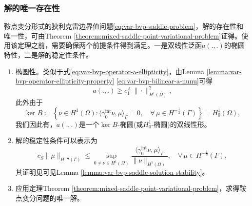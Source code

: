 \subsubsection{解的唯一存在性}
\label{sec:var-bvp-saddle-solution-uniq}
鞍点变分形式的狄利克雷边界值问题\eqref{eq:var-bvp-saddle-problem}，解的存在性和唯一性，可由Theorem \ref{theorem:mixed-saddle-point-variational-problem}证得。使用该定理之前，需要确保两个前提条件得到满足。一是双线性泛函$a(.,.)$的椭圆特性，二是解的稳定性条件。
\begin{enumerate}
\item 椭圆性。类似于式\eqref{eq:var-bvp-operator-a-ellipticity}，由Lemma \ref{lemma:var-bvp-operator-ellipticity-property} \eqref{eq:var-bvp-bilinear-a-nunu}可得
\begin{equation*}
  a(.,.) \ge c_1^A \, \big\| \cdot \big\|_{H^{1}(\Omega)}^2,
\end{equation*}
此外由于
\begin{equation*}
  \ker B \coloneqq \left\{
  \nu \in H^{1}(\Omega) : \langle \gamma_{0}^{\text{int}} \nu, \mu \rangle_{\Gamma} = 0, \quad \forall \, \mu \in H^{-\frac{1}{2}}(\Gamma)
  \right\} = H_{0}^{1}(\Omega),
\end{equation*}
我们因此有，$a(.,.)$是一个$\ker B$-椭圆(或$H_{0}^{1}$-椭圆)的双线性形。

\item 解的稳定性条件可以表示为
\begin{equation}
  \label{sec:var-bvp-saddle-solution-stability}
  c_S \big\| \mu \big\|_{H^{-\frac{1}{2}}(\Gamma)} \le
  \sup_{0 \neq \nu \in H^{1}(\Omega)} \frac{
  \langle \gamma_{0}^{\text{int}} \nu, \mu \rangle_{\Gamma}
  }{
  \big\| \nu \big\|_{H^{1}(\Omega)}
  }, \quad \forall \, \mu \in H^{-\frac{1}{2}}(\Gamma),
\end{equation}
其证明见可见Lemma \ref{lemma:var-bvp-saddle-solution-stability}。

\item 应用定理Theorem \ref{theorem:mixed-saddle-point-variational-problem}，求得鞍点变分问题的唯一解。
\end{enumerate}

